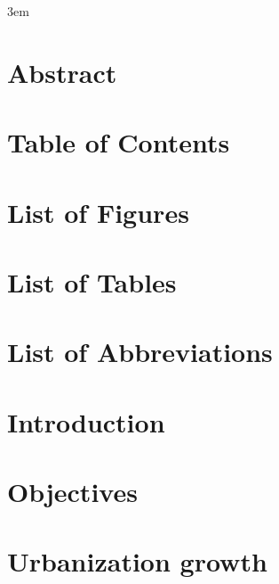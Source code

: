 \documentclass[10pt,twoside]{book}
\begin{document}
\emergencystretch 3em

\frontmatter




\chapter{Abstract}
% 
\clearpage

\chapter{Table of Contents}
\tableofcontents %
\clearpage

\chapter{List of Figures}
\listoffigures
\clearpage

\chapter{List of Tables}
\listoftables
\clearpage

\chapter{List of Abbreviations}

\clearpage

\mainmatter

\chapter{Introduction}
\clearpage


\clearpage

\chapter{Objectives}
\clearpage

% 
\clearpage

\chapter{Urbanization growth}
\clearpage
\end{document}
